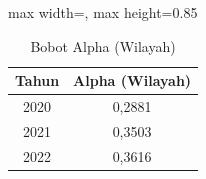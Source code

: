 \begin{table}[H]
\centering
\caption{Bobot Alpha (Wilayah)} \label{tab:samplealpha_w}
\begin{adjustbox}{max width=\textwidth, max height=0.85\textheight}
\begin{tabular}{|c|c|}
\hline
\textbf{Tahun} & \textbf{Alpha (Wilayah)} \\
\hline
2020 & 0,2881 \\
2021 & 0,3503 \\
2022 & 0,3616 \\
\hline
\end{tabular}
\end{adjustbox}
\end{table}